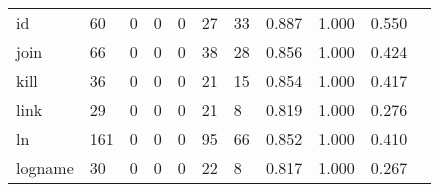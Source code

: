 \begin{longtable}{lp{1.2cm}p{1.2cm}p{1.2cm}p{1.2cm}p{1.2cm}p{1.2cm}p{1.2cm}p{1.2cm}p{1.2cm}p{1.2cm}}
id        &                                    60 &                                                  0 &                                                  0 &                                                  0 &                                                 27 &                                                 33 &                                              0.887 &                                              1.000 &                                              0.550 \\
join      &                                    66 &                                                  0 &                                                  0 &                                                  0 &                                                 38 &                                                 28 &                                              0.856 &                                              1.000 &                                              0.424 \\
kill      &                                    36 &                                                  0 &                                                  0 &                                                  0 &                                                 21 &                                                 15 &                                              0.854 &                                              1.000 &                                              0.417 \\
link      &                                    29 &                                                  0 &                                                  0 &                                                  0 &                                                 21 &                                                  8 &                                              0.819 &                                              1.000 &                                              0.276 \\
ln        &                                   161 &                                                  0 &                                                  0 &                                                  0 &                                                 95 &                                                 66 &                                              0.852 &                                              1.000 &                                              0.410 \\
logname   &                                    30 &                                                  0 &                                                  0 &                                                  0 &                                                 22 &                                                  8 &                                              0.817 &                                              1.000 &                                              0.267 \\

\end{longtable}
